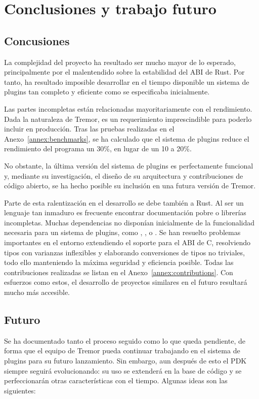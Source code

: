
\chapter{Conclusiones y trabajo futuro}

\section{Concusiones}

La complejidad del proyecto ha resultado ser mucho mayor de lo esperado,
principalmente por el malentendido sobre la estabilidad del ABI de Rust. Por
tanto, ha resultado imposible desarrollar en el tiempo disponible un sistema de
plugins tan completo y eficiente como se especificaba inicialmente.

Las partes incompletas están relacionadas mayoritariamente con el rendimiento.
Dada la naturaleza de Tremor, es un requerimiento imprescindible para poderlo
incluir en producción. Tras las pruebas realizadas en el
Anexo~\ref{annex:benchmarks}, se ha calculado que el sistema de plugins reduce
el rendimiento del programa un 30\%, en lugar de un 10 a 20\%.

No obstante, la última versión del sistema de plugins es perfectamente funcional
y, mediante su investigación, el diseño de su arquitectura y contribuciones de
código abierto, se ha hecho posible su inclusión en una futura versión de
Tremor.

Parte de esta ralentización en el desarrollo se debe también a Rust. Al ser un
lenguaje tan inmaduro es frecuente encontrar documentación pobre o librerías
incompletas. Muchas dependencias no disponían inicialmente de la funcionalidad
necesaria para un sistema de plugins, como , ,
 o . Se han resuelto problemas importantes en el
entorno extendiendo el soporte para el ABI de C, resolviendo tipos con varianzas
inflexibles y elaborando conversiones de tipos no triviales, todo ello
manteniendo la máxima seguridad y eficiencia posible. Todas las contribuciones
realizadas se listan en el Anexo~\ref{annex:contributions}. Con esfuerzos como
estos, el desarrollo de proyectos similares en el futuro resultará mucho más
accesible.

\section{Futuro}

Se ha documentado tanto el proceso seguido como lo que queda pendiente, de forma
que el equipo de Tremor pueda continuar trabajando en el sistema de plugins para
su futuro lanzamiento. Sin embargo, aun después de esto el PDK siempre seguirá
evolucionando: su uso se extenderá en la base de código y se perfeccionarán
otras características con el tiempo. Algunas ideas son las siguientes:

